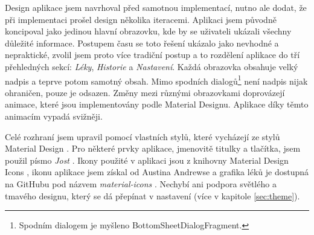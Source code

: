 \documentclass[../TakeYourPill.tex]{subfiles}
\begin{document}
Design aplikace jsem navrhoval před samotnou implementací, nutno ale dodat, že při implementaci prošel design několika iteracemi. Aplikaci jsem původně koncipoval jako jedinou hlavní obrazovku, kde by se uživateli ukázali všechny důležité informace. Postupem času se toto řešení ukázalo jako nevhodné a nepraktické, zvolil jsem proto více tradiční postup a to rozdělení aplikace do tří přehledných sekcí: \textit{Léky}, \textit{Historie} a \textit{Nastavení}. Každá obrazovka obsahuje velký nadpis a teprve potom samotný obsah. Mimo spodních dialogů\footnote{Spodním dialogem je myšleno BottomSheetDialogFragment.} není nadpis nijak ohraničen, pouze je odsazen. Změny mezi různými obrazovkami doprovázejí animace, které jsou implementovány podle Material Designu. Aplikace díky těmto animacím vypadá svižněji.

Celé rozhraní jsem upravil pomocí vlastních stylů, které vycházejí ze stylů Material Design \cite{materialdesign}. Pro některé prvky aplikace, jmenovitě titulky a tlačítka, jsem použil písmo \textit{Jost} \cite{jost}. Ikony použité v aplikaci jsou z knihovny Material Design Icons \cite{icons}, ikonu aplikace jsem získal od Austina Andrewse \cite{pill-icon} a grafika léků je dostupná na GitHubu pod názvem \textit{material-icons} \cite{pills-icons}. Nechybí ani podpora světlého a tmavého designu, který se dá přepínat v nastavení (více v kapitole \ref{sec:theme}).
\end{document}
